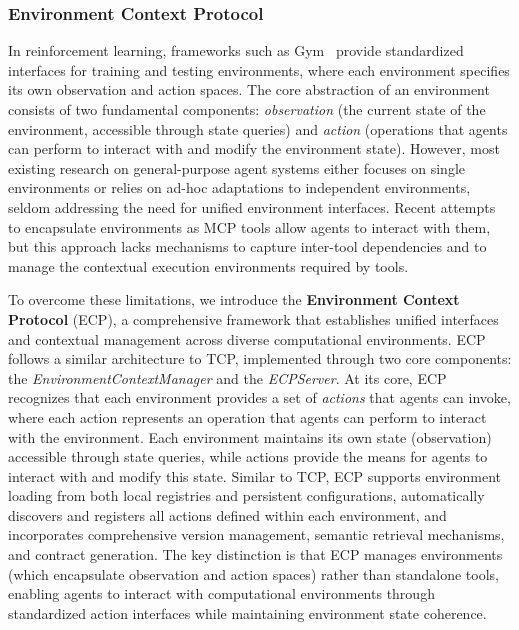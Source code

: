 \documentclass[11pt]{article}
\begin{document}
\subsubsection{Environment Context Protocol}

In reinforcement learning, frameworks such as Gym~\citep{brockman2016openai} provide standardized interfaces for training and testing environments, where each environment specifies its own observation and action spaces. The core abstraction of an environment consists of two fundamental components: \textit{observation} (the current state of the environment, accessible through state queries) and \textit{action} (operations that agents can perform to interact with and modify the environment state). However, most existing research on general-purpose agent systems either focuses on single environments or relies on ad-hoc adaptations to independent environments, seldom addressing the need for unified environment interfaces. Recent attempts to encapsulate environments as MCP tools allow agents to interact with them, but this approach lacks mechanisms to capture inter-tool dependencies and to manage the contextual execution environments required by tools.

To overcome these limitations, we introduce the \textbf{Environment Context Protocol} (ECP), a comprehensive framework that establishes unified interfaces and contextual management across diverse computational environments. ECP follows a similar architecture to TCP, implemented through two core components: the \textit{EnvironmentContextManager} and the \textit{ECPServer}. At its core, ECP recognizes that each environment provides a set of \textit{actions} that agents can invoke, where each action represents an operation that agents can perform to interact with the environment. Each environment maintains its own state (observation) accessible through state queries, while actions provide the means for agents to interact with and modify this state. Similar to TCP, ECP supports environment loading from both local registries and persistent configurations, automatically discovers and registers all actions defined within each environment, and incorporates comprehensive version management, semantic retrieval mechanisms, and contract generation. The key distinction is that ECP manages environments (which encapsulate observation and action spaces) rather than standalone tools, enabling agents to interact with computational environments through standardized action interfaces while maintaining environment state coherence.
\end{document}
